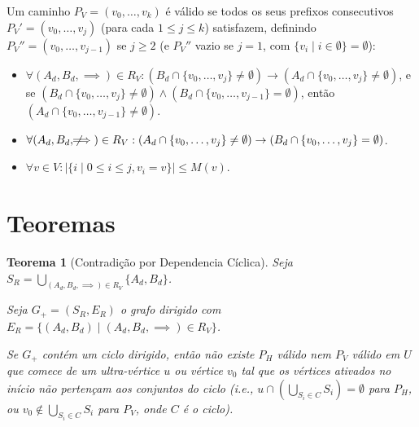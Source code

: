 \documentclass{article}
\newtheorem{theorem}{Teorema}
\begin{document}
Um caminho \( P_V = (v_0, \dots, v_k) \) é válido se todos os seus prefixos consecutivos \( P_V' = (v_0, \dots, v_j) \) (para cada \( 1 \leq j \leq k \)) satisfazem, definindo \( P_V'' = (v_0, \dots, v_{j-1}) \) se \( j \geq 2 \) (e \( P_V'' \) vazio se \( j = 1 \), com \( \{v_i \mid i \in \emptyset \} = \emptyset \)):

\begin{itemize}
    \item \( \forall (A_d, B_d, \implies) \in R_V: (B_d \cap \{v_0, \dots, v_j\} \neq \emptyset) \to (A_d \cap \{v_0, \dots, v_j\} \neq \emptyset) \), e se \( (B_d \cap \{v_0, \dots, v_j\} \neq \emptyset) \wedge (B_d \cap \{v_0, \dots, v_{j-1}\} = \emptyset) \), então \( (A_d \cap \{v_0, \dots, v_{j-1}\} \neq \emptyset) \).
    \item \( \forall (A_d, B_d, \not\!\!\!\implies) \in R_V: (A_d \cap \{v_0, \dots, v_j\} \neq \emptyset) \to (B_d \cap \{v_0, \dots, v_j\} = \emptyset) \).
    \item \( \forall v \in V: |\{ i \mid 0 \leq i \leq j, v_i = v \}| \leq M(v) \).
\end{itemize}

\section{Teoremas}

\begin{theorem}[Contradição por Dependencia Cíclica]
\hfill

Seja \( S_R = \bigcup_{(A_d, B_d, \implies) \in R_V} \{ A_d, B_d \} \).

Seja \( G_{+} = (S_R, E_R) \) o grafo dirigido com \( E_R = \{ (A_d, B_d) \mid (A_d, B_d, \implies) \in R_V \} \).

Se \( G_{+} \) contém um ciclo dirigido, então não existe \( P_H \) válido nem \( P_V \) válido em \( U \) que comece de um ultra-vértice \( u \) ou vértice \( v_0 \) tal que os vértices ativados no início não pertençam aos conjuntos do ciclo (i.e., \( u \cap \left( \bigcup_{S_i \in C} S_i \right) = \emptyset \) para \( P_H \), ou \( v_0 \notin \bigcup_{S_i \in C} S_i \) para \( P_V \), onde \( C \) é o ciclo).
\end{theorem}
\end{document}

